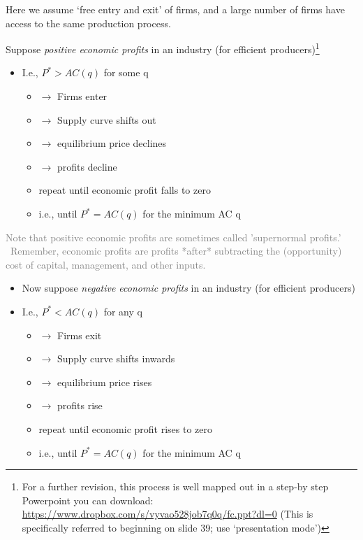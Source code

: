 \documentclass[]{article}
\providecommand{\tightlist}{%
  \setlength{\itemsep}{0pt}\setlength{\parskip}{0pt}}
\begin{document}
Here we assume `free entry and exit' of firms, and a large number of
firms have access to the same production process.

Suppose \emph{positive economic profits} in an industry (for efficient
producers)\footnote{For a further revision, this process is well mapped
  out in a step-by step Powerpoint you can download:
  \url{https://www.dropbox.com/s/vyvao528job7q0q/fc.ppt?dl=0} (This is
  specifically referred to beginning on slide 39; use `presentation
  mode')}

\begin{itemize}
\tightlist
\item
  I.e., \(P^*>AC(q)\) for some q

  \begin{itemize}
  \tightlist
  \item
    \(\rightarrow\) Firms enter
  \item
    \(\rightarrow\) Supply curve shifts out
  \item
    \(\rightarrow\) equilibrium price declines
  \item
    \(\rightarrow\) profits decline
  \item
    repeat until economic profit falls to zero
  \item
    i.e., until \(P^*=AC(q)\) for the minimum AC q
  \end{itemize}
\end{itemize}

\textcolor{gray}{Note that positive economic profits are sometimes called 'supernormal profits.' \
 Remember, economic profits are profits *after* subtracting the (opportunity) cost of capital, management, and other inputs.}

\begin{itemize}
\tightlist
\item
  Now suppose \emph{negative economic profits} in an industry (for
  efficient producers)
\item
  I.e., \(P^*<AC(q)\) for any q

  \begin{itemize}
  \tightlist
  \item
    \(\rightarrow\) Firms exit
  \item
    \(\rightarrow\) Supply curve shifts inwards
  \item
    \(\rightarrow\) equilibrium price rises
  \item
    \(\rightarrow\) profits rise
  \item
    repeat until economic profit rises to zero
  \item
    i.e., until \(P^*=AC(q)\) for the minimum AC q
  \end{itemize}
\end{itemize}
\end{document}
